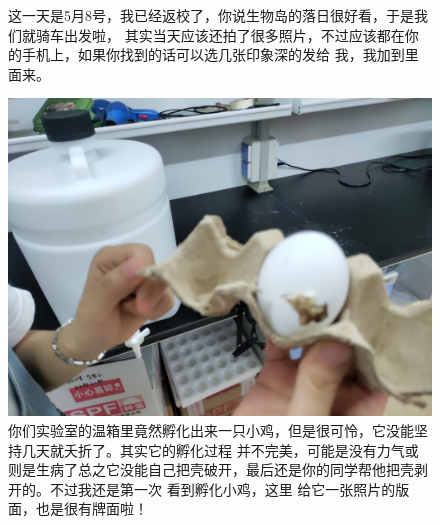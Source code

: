 \documentclass[cn,11pt,chinese]{elegantbook}
\begin{document}
\begin{figure}
    \caption{这一天是5月8号，我已经返校了，你说生物岛的落日很好看，于是我们就骑车出发啦，
    其实当天应该还拍了很多照片，不过应该都在你的手机上，如果你找到的话可以选几张印象深的发给
    我，我加到里面来。}
\end{figure}
\begin{figure}
    \includegraphics[height=0.2\textheight]{figure/figure/egg.jpg}
    \caption{你们实验室的温箱里竟然孵化出来一只小鸡，但是很可怜，它没能坚持几天就夭折了。其实它的孵化过程
    并不完美，可能是没有力气或则是生病了总之它没能自己把壳破开，最后还是你的同学帮他把壳剥开的。不过我还是第一次
    看到孵化小鸡，这里
    给它一张照片的版面，也是很有牌面啦！}
\end{figure}
\end{document}
